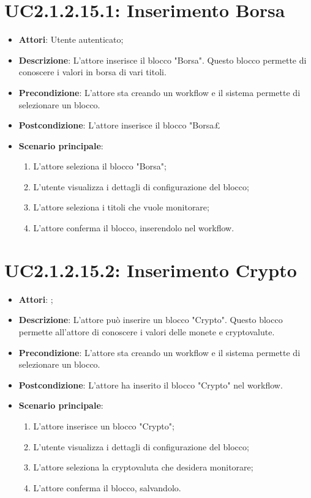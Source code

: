 \section{UC2.1.2.15.1: Inserimento Borsa}
\label{UC2.1.2.15.1}
\begin{itemize}
	\item \textbf{Attori}: Utente autenticato;
	\item \textbf{Descrizione}: L'attore inserisce il blocco "Borsa". Questo blocco permette di conoscere i valori in borsa di vari titoli. 
	\item \textbf{Precondizione}: L'attore sta creando un workflow e il sistema permette di selezionare un blocco.
	\item \textbf{Postcondizione}: L'attore inserisce il blocco "Borsa£
	\item \textbf{Scenario principale}:
	\begin{enumerate} \item L'attore seleziona il blocco "Borsa"; \item L'utente visualizza i dettagli di configurazione del blocco;   \item  L'attore seleziona i titoli che vuole monitorare; \item L'attore conferma il blocco, inserendolo nel workflow. \end{enumerate}
\end{itemize}

\section{UC2.1.2.15.2: Inserimento Crypto}
\label{UC2.1.2.15.2}
\begin{itemize}
	\item \textbf{Attori}: ;
	\item \textbf{Descrizione}: L'attore può inserire un blocco "Crypto". Questo blocco permette all'attore di conoscere i valori delle monete e cryptovalute.
	\item \textbf{Precondizione}: L'attore sta creando un workflow e il sistema permette di selezionare un blocco.
	\item \textbf{Postcondizione}: L'attore ha inserito il blocco "Crypto" nel workflow.
	\item \textbf{Scenario principale}:
	\begin{enumerate} \item L'attore inserisce un blocco "Crypto";  \item  L'utente visualizza i dettagli di configurazione del blocco;   \item  L'attore seleziona la cryptovaluta che desidera monitorare; \item L'attore conferma il blocco, salvandolo. \end{enumerate}
\end{itemize}

